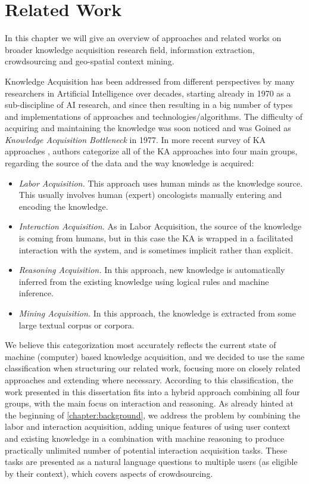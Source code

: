 \chapter{Related Work}
\label{chapter:related}
In this chapter we will give an overview of approaches and related works on
broader knowledge acquisition research field, information extraction, 
crowdsourcing and geo-spatial context mining. 

Knowledge Acquisition has been addressed from different perspectives by many 
researchers in Artificial Intelligence over decades, starting already in 1970 
as a sub-discipline of AI research, and since then resulting in a big number of 
types and implementations of approaches and technologies/algorithms. The 
difficulty of acquiring and maintaining the knowledge was soon noticed and was 
Goined as \emph{Knowledge Acquisition Bottleneck} in 
1977\parencite{Feigenbaum1977}. In more recent survey of KA approaches 
\parencite{Zang2013}, authors categorize all of the KA approaches into four main
groups, regarding the source of the data and the way knowledge is acquired:
\begin{itemize}
	\item \emph{Labor Acquisition.} This approach uses human minds as the 
    knowledge source. This usually involves human (expert) oncologists manually 
    entering and encoding the knowledge.
	\item \emph{Interaction Acquisition.} As in Labor Acquisition, the source 
    of the knowledge is coming from humans, but in this case the KA is wrapped 
    in a facilitated interaction with the system, and is sometimes implicit 
    rather than explicit.
	\item \emph{Reasoning Acquisition.} In this approach, new knowledge is 
    automatically inferred from the existing knowledge using logical rules and 
    machine inference.
	\item \emph{Mining Acquisition.} In this approach, the knowledge is 
    extracted from some large textual corpus or corpora.
\end{itemize}

We believe this categorization most accurately reflects the current state of 
machine (computer) based knowledge acquisition, and we decided to use the same 
classification when structuring our related work, focusing more on closely 
related approaches and extending where necessary. According to this 
classification, the work presented in this dissertation fits into a hybrid 
approach combining all four groups, with the main focus on interaction and 
reasoning. As already hinted at the beginning of \autoref{chapter:background},
we address the problem by combining the labor and interaction acquisition, 
adding unique features of using user context and existing knowledge in a 
combination with machine reasoning to produce practically unlimited number of 
potential interaction acquisition tasks. These tasks are presented as a 
natural language questions to multiple users (as eligible by their context),
which covers aspects of crowdsourcing. 

